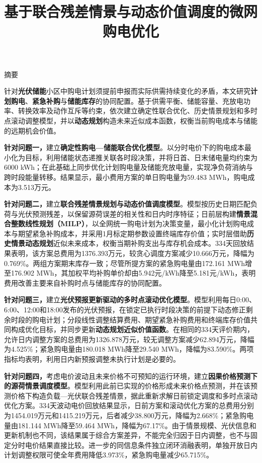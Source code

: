 \documentclass[zihao=-4,a4paper,UTF8,fontset=none]{ctexart}
\title{基于联合残差情景与动态价值调度的微网购电优化}
\makeatletter
\providecommand{\heiti}{}
\renewcommand{\heiti}{\CJKfamily{zhhei}}
\renewcommand{\maketitle}{%
  \thispagestyle{plain}\setcounter{page}{1}%
  \begin{center}
    {\heiti\zihao{3}\@title\par}
    \vspace{1em}
    {\heiti\zihao{4}摘\quad 要\par}
  \end{center}}
\makeatother
\begin{document}
\maketitle
\begin{cumcmabstract}
\linespread{1.02}\selectfont
\par\indent%
针对\textbf{光伏储能}小区中购电计划须提前申报而实际供需持续变化的矛盾，本文研究\textbf{计划购电}、\textbf{紧急补购}与\textbf{储能库存}的协同配置。基于供需平衡、储能容量、充放电功率、转换效率及动作互斥等约束，依次建立确定性联合优化、历史情景规划和多时点滚动调整模型，并以\textbf{动态规划}构造未来近似成本函数，权衡当前购电成本与储能的远期机会价值。

\textbf{针对问题一，}建立\textbf{确定性购电---储能联合优化模型}。以分时电价下的购电成本最小化为目标，利用储能状态递推关联各时段决策，并将日首、日末储电量均约束为6000 kWh；在此基础上同步优化计划购电量及储能充放电量，实现净负荷消纳与跨时段能量转移。结果显示，最小费用方案的单日购电量为59.483 MWh，购电成本为3.513万元。

\textbf{针对问题二，}建立\textbf{联合残差情景规划与动态价值调度模型}。模型按历史日期匹配负荷与光伏预测残差，以保留源荷误差的相关性和日内时序特征；日前层构建\textbf{情景混合整数线性规划（MILP）}，以全网统一购电计划为决策变量，最小化计划购电成本与期望紧急补购成本，并采用1月标定期参数设置终端库存价值；实时层借助\textbf{历史情景动态规划}近似未来成本，权衡当期补购支出与库存机会成本。334天回放结果表明，该方案总费用为1376.393万元，较贪心调度方案减少10.666万元，降幅为0.769\%。两组方案期末库存一致；尽管所提方案的紧急购电量由172.161 MWh增至176.902 MWh，其加权平均补购单价却由5.942元/kWh降至5.181元/kWh，表明费用改善主要来自补购时点与储能库存的协同配置。

\textbf{针对问题三，}建立\textbf{光伏预报更新驱动的多时点滚动优化模型}。模型利用每日0:00、6:00、12:00和18:00发布的光伏预报，在锁定已执行时段决策的前提下动态修正剩余时段的购电计划；分段线性调整结算费用、期望紧急补购费用和终端库存价值共同构成优化目标，并同步更新\textbf{动态规划近似价值函数}。在相同的334天评价期内，允许日内调整方案的总费用为1326.878万元，较无调整方案减少62.894万元，降幅为4.525\%；紧急购电量由180.018 MWh降至29.540 MWh，降幅为83.590\%。两项指标均表明，利用日内新预报调整未执行计划是必要的。

\textbf{针对问题四，}考虑电价波动且未来价格不可预知的运行环境，建立\textbf{因果价格预测下的源荷情景调度模型}。模型利用此前已实现的价格形成未来价格点预测，并在该预测价格下构造负载---光伏联合残差情景，据此重新求解日前锁定调度和多时点滚动优化方案。334天波动电价回放结果显示，日前方案和滚动优化方案的总费用分别为1454.019万元和1415.219万元，后者减少38.800万元，降幅为2.668\%；紧急购电量由181.144 MWh降至59.464 MWh，降幅为67.17\%。由于情景规模、光伏信息和更新机制也不同，该结果属于综合方案差异，不能完全归因于日内调整，也不与固定分时电价结果直接比较。进一步的同信息条件独立闭环消融表明，单独开放日内计划调整权限可使全年费用降低3.973\%，紧急购电量减少65.715\%。


\end{cumcmabstract}
\end{document}
